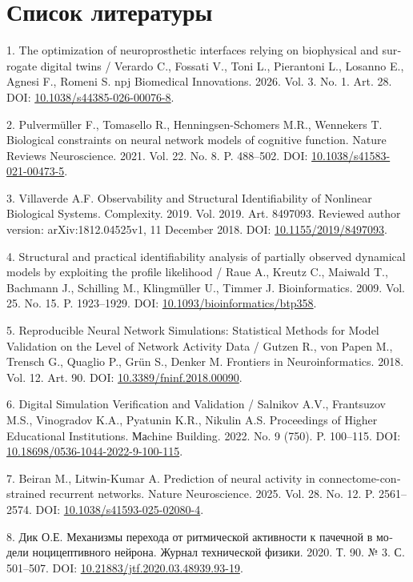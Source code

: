 \documentclass[12pt,a4paper]{article}
\begin{document}
\section*{Список литературы}
\noindent\foreignlanguage{english}{1. The optimization of neuroprosthetic interfaces relying on biophysical and surrogate digital twins / Verardo C., Fossati V., Toni L., Pierantoni L., Losanno E., Agnesi F., Romeni S. npj Biomedical Innovations. 2026. Vol. 3. No. 1. Art. 28. DOI: \url{10.1038/s44385-026-00076-8}.}\par
\noindent\foreignlanguage{english}{2. Pulvermüller F., Tomasello R., Henningsen-Schomers M.R., Wennekers T. Biological constraints on neural network models of cognitive function. Nature Reviews Neuroscience. 2021. Vol. 22. No. 8. P. 488–502. DOI: \url{10.1038/s41583-021-00473-5}.}\par
\noindent\foreignlanguage{english}{3. Villaverde A.F. Observability and Structural Identifiability of Nonlinear Biological Systems. Complexity. 2019. Vol. 2019. Art. 8497093. Reviewed author version: arXiv:1812.04525v1, 11 December 2018. DOI: \url{10.1155/2019/8497093}.}\par
\noindent\foreignlanguage{english}{4. Structural and practical identifiability analysis of partially observed dynamical models by exploiting the profile likelihood / Raue A., Kreutz C., Maiwald T., Bachmann J., Schilling M., Klingmüller U., Timmer J. Bioinformatics. 2009. Vol. 25. No. 15. P. 1923–1929. DOI: \url{10.1093/bioinformatics/btp358}.}\par
\noindent\foreignlanguage{english}{5. Reproducible Neural Network Simulations: Statistical Methods for Model Validation on the Level of Network Activity Data / Gutzen R., von Papen M., Trensch G., Quaglio P., Grün S., Denker M. Frontiers in Neuroinformatics. 2018. Vol. 12. Art. 90. DOI: \url{10.3389/fninf.2018.00090}.}\par
\noindent\foreignlanguage{english}{6. Digital Simulation Verification and Validation / Salnikov A.V., Frantsuzov M.S., Vinogradov K.A., Pyatunin K.R., Nikulin A.S. Proceedings of Higher Educational Institutions. Маchine Building. 2022. No. 9 (750). P. 100–115. DOI: \url{10.18698/0536-1044-2022-9-100-115}.}\par
\noindent\foreignlanguage{english}{7. Beiran M., Litwin-Kumar A. Prediction of neural activity in connectome-constrained recurrent networks. Nature Neuroscience. 2025. Vol. 28. No. 12. P. 2561–2574. DOI: \url{10.1038/s41593-025-02080-4}.}\par
\noindent\foreignlanguage{russian}{8. Дик О.Е. Механизмы перехода от ритмической активности к пачечной в модели ноцицептивного нейрона. Журнал технической физики. 2020. Т. 90. № 3. С. 501–507. DOI: \url{10.21883/jtf.2020.03.48939.93-19}.}\par
\end{document}

